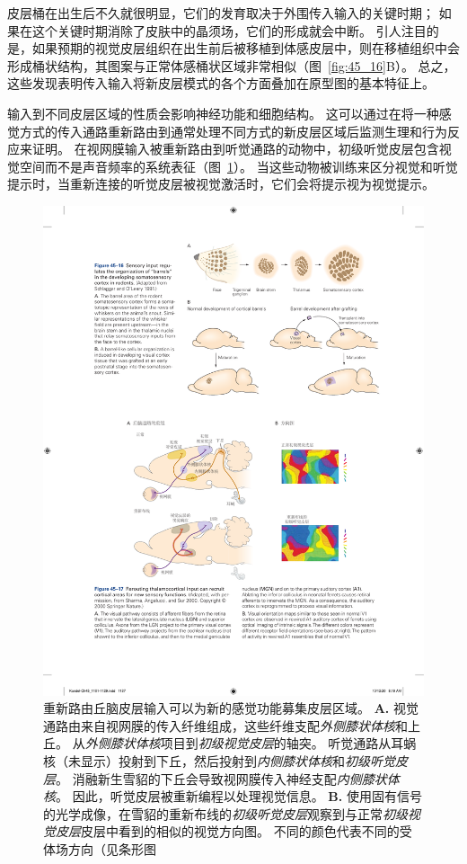 皮层桶在出生后不久就很明显，它们的发育取决于外围传入输入的关键时期；
如果在这个关键时期消除了皮肤中的晶须场，它们的形成就会中断。
引人注目的是，如果预期的视觉皮层组织在出生前后被移植到体感皮层中，则在移植组织中会形成桶状结构，其图案与正常体感桶状区域非常相似（图~\ref{fig:45_16}B）。
总之，这些发现表明传入输入将新皮层模式的各个方面叠加在原型图的基本特征上。


输入到不同皮层区域的性质会影响神经功能和细胞结构。
这可以通过在将一种感觉方式的传入通路重新路由到通常处理不同方式的新皮层区域后监测生理和行为反应来证明。
在视网膜输入被重新路由到听觉通路的动物中，初级听觉皮层包含视觉空间而不是声音频率的系统表征（图~\ref{fig:45_17}）。
当这些动物被训练来区分视觉和听觉提示时，当重新连接的听觉皮层被视觉激活时，它们会将提示视为视觉提示。


\begin{figure}[htbp]
	\centering
	\includegraphics[width=0.9\linewidth]{chap45/fig_45_17}
	\caption{重新路由丘脑皮层输入可以为新的感觉功能募集皮层区域\cite{sharma2000induction}。
		\textbf{A.} 视觉通路由来自视网膜的传入纤维组成，这些纤维支配\textit{外侧膝状体核}和上丘。
		从\textit{外侧膝状体核}项目到\textit{初级视觉皮层}的轴突。
		听觉通路从耳蜗核（未显示）投射到下丘，然后投射到\textit{内侧膝状体核}和\textit{初级听觉皮层}。
		消融新生雪貂的下丘会导致视网膜传入神经支配\textit{内侧膝状体核}。
		因此，听觉皮层被重新编程以处理视觉信息。
		\textbf{B.} 使用固有信号的光学成像，在雪貂的重新布线的\textit{初级听觉皮层}观察到与正常\textit{初级视觉皮层}皮层中看到的相似的视觉方向图。
		不同的颜色代表不同的受体场方向（见条形图}
	\label{fig:45_17}
\end{figure}


